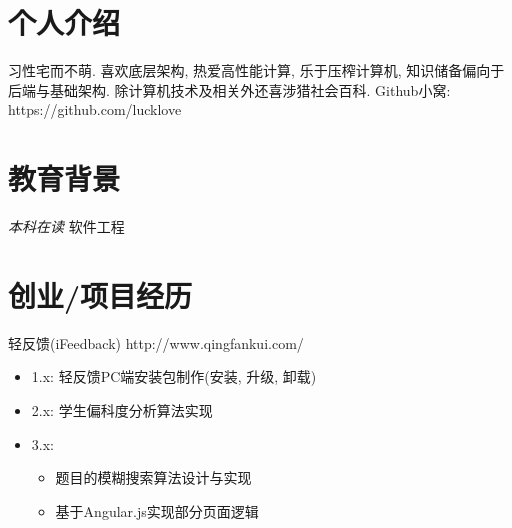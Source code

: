 \documentclass{resume}
\begin{document}



\section{\faUser 个人介绍}
习性宅而不萌.
\newline
喜欢底层架构, 热爱高性能计算, 乐于压榨计算机, 知识储备偏向于后端与基础架构.
\newline
除计算机技术及相关外还喜涉猎社会百科.
\newline
Github小窝: https://github.com/lucklove

\section{\faGraduationCap 教育背景}
\textit{本科在读} 软件工程

\section{\faStar 创业/项目经历}
\begin{onehalfspacing}
轻反馈(iFeedback)
\newline
http://www.qingfankui.com/
\begin{itemize}
  \item 1.x: 轻反馈PC端安装包制作(安装, 升级, 卸载)
  \item 2.x: 学生偏科度分析算法实现
  \item 3.x:
  \begin{itemize} 
    \item 题目的模糊搜索算法设计与实现 
    \item 基于Angular.js实现部分页面逻辑
  \end{itemize}
\end{itemize}
\end{onehalfspacing}
\end{document}

